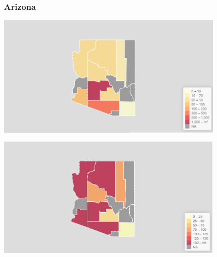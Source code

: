 \documentclass[11pt]{article}
\begin{document}
\begin{landscape}
\begin{figure}[h]
\subsubsection*{Arizona}
\vfill
\hspace*{-3cm}
\begin{minipage}{.8\textwidth}
    \includegraphics[width=.95\textwidth]{ImageResults/ArizonaTotal.PNG}
\end{minipage}%
\begin{minipage}{.8\textwidth}
    \includegraphics[width=.95\textwidth]{ImageResults/Arizona100k.PNG}
    \label{fig:Ariz100k}
\end{minipage}
\fillandplacepagenumber
\end{figure}
\end{landscape}
\end{document}
